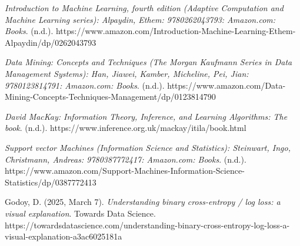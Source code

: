 \documentclass[conference]{IEEEtran}
\begin{document}
\begin{thebibliography}{00}
        \textit{Introduction to Machine Learning, fourth edition (Adaptive Computation and Machine Learning series): Alpaydin, Ethem: 9780262043793: Amazon.com: Books}.
        (n.d.). https://www.amazon.com/Introduction-Machine-Learning-Ethem-Alpaydin/dp/0262043793

        \textit{Data Mining: Concepts and Techniques (The Morgan Kaufmann Series in Data Management Systems): Han, Jiawei, Kamber, Micheline, Pei, Jian: 9780123814791: Amazon.com: Books}.
        (n.d.). https://www.amazon.com/Data-Mining-Concepts-Techniques-Management/dp/0123814790

        \textit{David MacKay: Information Theory, Inference, and Learning Algorithms: The book}.
        (n.d.). https://www.inference.org.uk/mackay/itila/book.html

        \textit{Support vector Machines (Information Science and Statistics): Steinwart, Ingo, Christmann, Andreas: 9780387772417: Amazon.com: Books}.
        (n.d.). https://www.amazon.com/Support-Machines-Information-Science-Statistics/dp/0387772413

        Godoy, D. (2025, March 7). \textit{Understanding binary cross-entropy / log loss: a visual explanation}.
        Towards Data Science.
        https://towardsdatascience.com/understanding-binary-cross-entropy-log-loss-a-visual-explanation-a3ac6025181a


\end{thebibliography}
\end{document}
